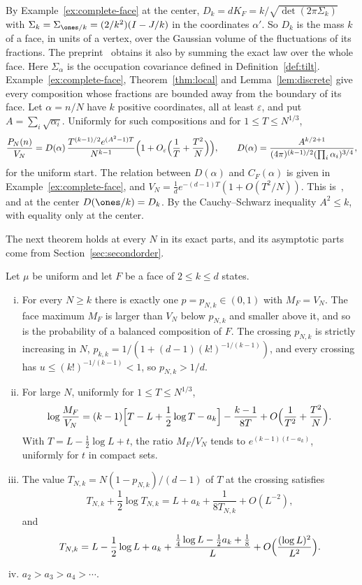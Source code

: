 By Example~\ref{ex:complete-face} at the center, $D_k=dK_F=k/\sqrt{\det(2\pi\Sigma_k)}$ with
$\Sigma_k=\Sigma_{\ones/k}=(2/k^2)(I-J/k)$ in the coordinates $\alpha'$. So $D_k$ is the mass $k$
of a face, in units of a vertex, over the Gaussian volume of the fluctuations of its
fractions. The preprint~\cite[Proposition~3.7]{paperB} obtains it also by summing the exact law over
the whole face. Here $\Sigma_\alpha$ is the occupation covariance defined in
Definition~\ref{def:tilt}. Example~\ref{ex:complete-face},
Theorem~\ref{thm:local} and Lemma~\ref{lem:discrete} give every composition whose fractions are
bounded away from the boundary of its face. Let $\alpha=n/N$ have $k$ positive coordinates,
all at least $\varepsilon$, and put $A=\sum_i\sqrt{\alpha_i}$. Uniformly for such compositions and for
$1\le T\le N^{1/3}$,
\begin{equation}\label{eq:interior}
\frac{P_N(n)}{V_N}=D(\alpha)\,\frac{T^{(k-1)/2}e^{(A^2-1)T}}{N^{k-1}}
\Bigl(1+O_\varepsilon\Bigl(\frac1T+\frac{T^2}N\Bigr)\Bigr),\qquad
D(\alpha)=\frac{A^{k/2+1}}{(4\pi)^{(k-1)/2}(\prod_i\alpha_i)^{3/4}},
\end{equation}
for the uniform start. The relation between $D(\alpha)$ and $C_F(\alpha)$ is given in
Example~\ref{ex:complete-face}, and $V_N=\frac1de^{-(d-1)T}(1+O(T^2/N))$.
This is~\cite[Theorem~3.3]{paperB}, and at the center
$D(\ones/k)=D_k$. By the Cauchy--Schwarz inequality $A^2\le k$, with equality only at the
center.

The next theorem holds at every $N$ in its exact parts, and its asymptotic parts come from
Section~\ref{sec:secondorder}.

\begin{theorem}\label{thm:simplex-crossing}
Let $\mu$ be uniform and let $F$ be a face of $2\le k\le d$ states.
\begin{enumerate}[(i)]
\item For every $N\ge k$ there is exactly one $p=p_{N,k}\in(0,1)$ with $M_F=V_N$. The face
maximum $M_F$ is larger than $V_N$ below $p_{N,k}$ and smaller above it, and so is the
probability of a balanced composition of $F$. The crossing $p_{N,k}$ is strictly increasing in $N$,
$p_{k,k}=1/(1+(d-1)(k!)^{-1/(k-1)})$, and every crossing has $u\le(k!)^{-1/(k-1)}<1$, so
$p_{N,k}>1/d$.
\item For large $N$, uniformly for $1\le T\le N^{1/3}$,
\[
\log\frac{M_F}{V_N}=(k-1)\Bigl[T-L+\frac12\log T-a_k\Bigr]-\frac{k-1}{8T}
+O\Bigl(\frac1{T^2}+\frac{T^2}N\Bigr).
\]
With $T=L-\frac12\log L+t$, the ratio $M_F/V_N$ tends to $e^{(k-1)(t-a_k)}$, uniformly for
$t$ in compact sets.
\item The value $T_{N,k}=N(1-p_{N,k})/(d-1)$ of $T$ at the crossing satisfies
\[
T_{N,k}+\frac12\log T_{N,k}=L+a_k+\frac1{8T_{N,k}}+O(L^{-2}),
\]
and
\begin{equation}\label{eq:simplex-root-expansion}
T_{N,k}=L-\frac12\log L+a_k+\frac{\frac14\log L-\frac12a_k+\frac18}L
+O\Bigl(\frac{(\log L)^2}{L^2}\Bigr).
\end{equation}
\item $a_2>a_3>a_4>\cdots$.
\end{enumerate}
\end{theorem}

